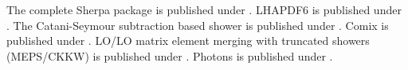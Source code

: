 \documentclass{article}
\begin{document}
The complete Sherpa package is published under \cite{Gleisberg:2008ta}.
LHAPDF6 is published under \cite{Buckley:2014ana}.
The Catani-Seymour subtraction based shower is published under \cite{Schumann:2007mg}.
Comix is published under \cite{Gleisberg:2008fv}.
LO/LO matrix element merging with truncated showers (MEPS/CKKW) is published under \cite{Hoeche:2009rj}.
Photons is published under \cite{Schonherr:2008av}.
\end{document}

